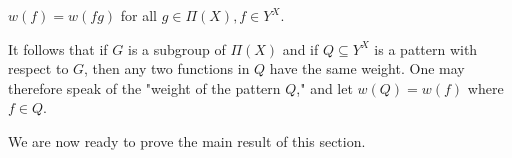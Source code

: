 $w(f) = w(fg)$ for all $g \in \Pi(X), f \in Y^X$.

It follows that if $G$ is a subgroup of $\Pi(X)$ and if $Q \subseteq Y^X$ is a pattern with respect to $G$, then any two functions in $Q$ have the same weight. One may therefore speak of the "weight of the pattern $Q$," and let $w(Q) = w(f)$ where $f \in Q$.

We are now ready to prove the main result of this section.
